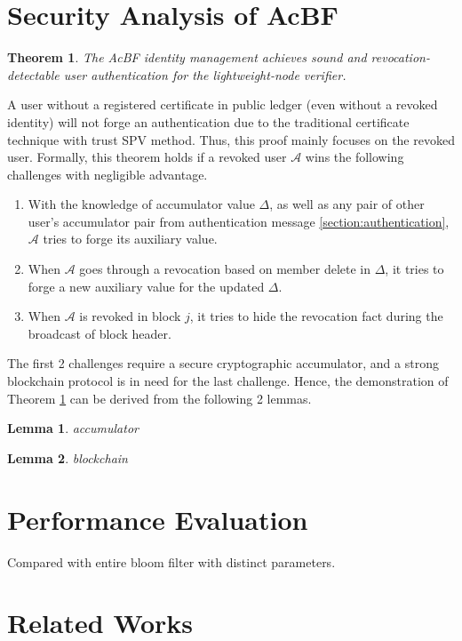 \documentclass[conference]{IEEEtran}
\newtheorem{theorem}{Theorem}
\newtheorem{lemma}{Lemma}[theorem]
\begin{document}
\section{Security Analysis of AcBF}
\begin{theorem}\label{theo:security}
	The AcBF identity management achieves sound and revocation-detectable user authentication for the lightweight-node verifier.
\end{theorem}

\begin{IEEEproof}
    A user without a registered certificate in public ledger (even without a revoked identity) will not forge an authentication due to the traditional certificate technique with trust SPV method. Thus, this proof mainly focuses on the revoked user. Formally, this theorem holds if a revoked user $\mathcal{A}$ wins the following challenges with negligible advantage.
    \begin{enumerate}
        \item With the knowledge of accumulator value $\Delta$, as well as any pair of other user's accumulator pair from authentication message \ref{section:authentication}, $\mathcal{A}$ tries to forge its auxiliary value.
        \item When $\mathcal{A}$ goes through a revocation based on member delete in $\Delta$, it tries to forge a new auxiliary value for the updated $\Delta$.
        \item When $\mathcal{A}$ is revoked in block $j$, it tries to hide the revocation fact during the broadcast of block header.
    \end{enumerate}

    The first 2 challenges require a secure cryptographic accumulator, and a strong blockchain protocol is in need for the last challenge. Hence, the demonstration of Theorem \ref{theo:security} can be derived from the following 2 lemmas.
\end{IEEEproof}
\begin{lemma}
    accumulator
\end{lemma}

\begin{lemma}
    blockchain
\end{lemma}

\section{Performance Evaluation}

Compared with entire bloom filter with distinct parameters.

\section{Related Works}
\end{document}
